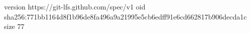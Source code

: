 version https://git-lfs.github.com/spec/v1
oid sha256:771bb1164d8f1b96de8fa496a9a21995e5cb6edff91e6cd662817b906decda1c
size 77
